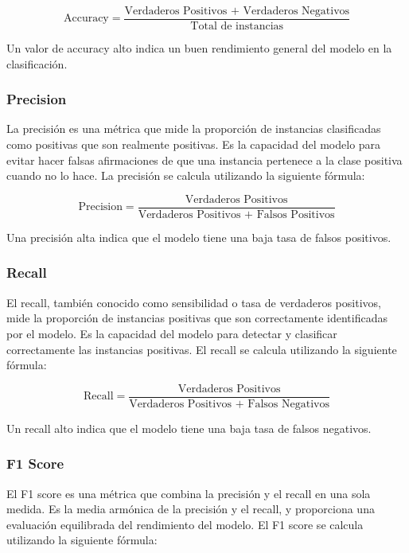 \begin{equation}
  \text{Accuracy} = \frac{\text{Verdaderos Positivos + Verdaderos Negativos}}{\text{Total de instancias}}
\end{equation}

Un valor de accuracy alto indica un buen rendimiento general del modelo en la clasificación.

\subsubsection{Precision}
La precisión es una métrica que mide la proporción de instancias clasificadas como positivas que son realmente positivas. Es la capacidad del modelo para evitar hacer falsas afirmaciones de que una instancia pertenece a la clase positiva cuando no lo hace. La precisión se calcula utilizando la siguiente fórmula:

\begin{equation}
  \text{Precision} = \frac{\text{Verdaderos Positivos}}{\text{Verdaderos Positivos + Falsos Positivos}}
\end{equation}

Una precisión alta indica que el modelo tiene una baja tasa de falsos positivos.

\subsubsection{Recall}
El recall, también conocido como sensibilidad o tasa de verdaderos positivos, mide la proporción de instancias positivas que son correctamente identificadas por el modelo. Es la capacidad del modelo para detectar y clasificar correctamente las instancias positivas. El recall se calcula utilizando la siguiente fórmula:

\begin{equation}
  \text{Recall} = \frac{\text{Verdaderos Positivos}}{\text{Verdaderos Positivos + Falsos Negativos}}
\end{equation}

Un recall alto indica que el modelo tiene una baja tasa de falsos negativos.

\subsubsection{F1 Score}
El F1 score es una métrica que combina la precisión y el recall en una sola medida. Es la media armónica de la precisión y el recall, y proporciona una evaluación equilibrada del rendimiento del modelo. El F1 score se calcula utilizando la siguiente fórmula:

